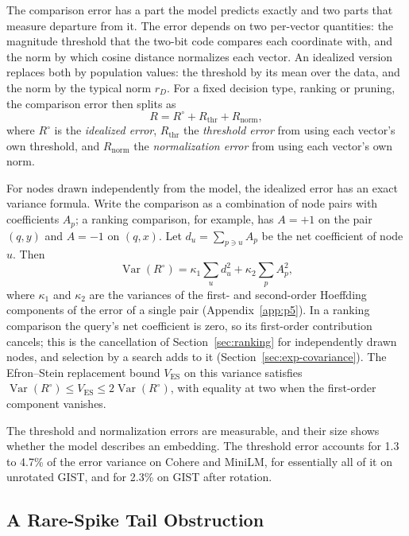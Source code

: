 \documentclass[twoside,11pt]{article}
\newcommand{\Var}{\operatorname{Var}}
\begin{document}
The comparison error has a part the model predicts exactly and two parts that measure departure from it. The error depends on two per-vector quantities: the magnitude threshold that the two-bit code compares each coordinate with, and the norm by which cosine distance normalizes each vector. An idealized version replaces both by population values: the threshold by its mean over the data, and the norm by the typical norm $r_D$. For a fixed decision type, ranking or pruning, the comparison error then splits as
\begin{equation}
R=R^\circ+R_{\mathrm{thr}}+R_{\mathrm{norm}},
\label{eq:population-decomposition}
\end{equation}
where $R^\circ$ is the \emph{idealized error}, $R_{\mathrm{thr}}$ the \emph{threshold error} from using each vector's own threshold, and $R_{\mathrm{norm}}$ the \emph{normalization error} from using each vector's own norm.

For nodes drawn independently from the model, the idealized error has an exact variance formula. Write the comparison as a combination of node pairs with coefficients $A_p$; a ranking comparison, for example, has $A=+1$ on the pair $(q,y)$ and $A=-1$ on $(q,x)$. Let $d_u=\sum_{p\ni u}A_p$ be the net coefficient of node $u$. Then
\begin{equation}
\Var(R^\circ)=\kappa_1\sum_ud_u^2+\kappa_2\sum_pA_p^2,
\label{eq:oracle-variance}
\end{equation}
where $\kappa_1$ and $\kappa_2$ are the variances of the first- and second-order Hoeffding components of the error of a single pair (Appendix~\ref{app:p5}). In a ranking comparison the query's net coefficient is zero, so its first-order contribution cancels; this is the cancellation of Section~\ref{sec:ranking} for independently drawn nodes, and selection by a search adds to it (Section~\ref{sec:exp-covariance}). The Efron--Stein replacement bound $V_{\mathrm{ES}}$ on this variance satisfies $\Var(R^\circ)\le V_{\mathrm{ES}}\le2\Var(R^\circ)$, with equality at two when the first-order component vanishes.

The threshold and normalization errors are measurable, and their size shows whether the model describes an embedding. The threshold error accounts for 1.3 to 4.7\% of the error variance on Cohere and MiniLM, for essentially all of it on unrotated GIST, and for 2.3\% on GIST after rotation.

\subsection{A Rare-Spike Tail Obstruction}
\label{sec:counterexample}
\end{document}
